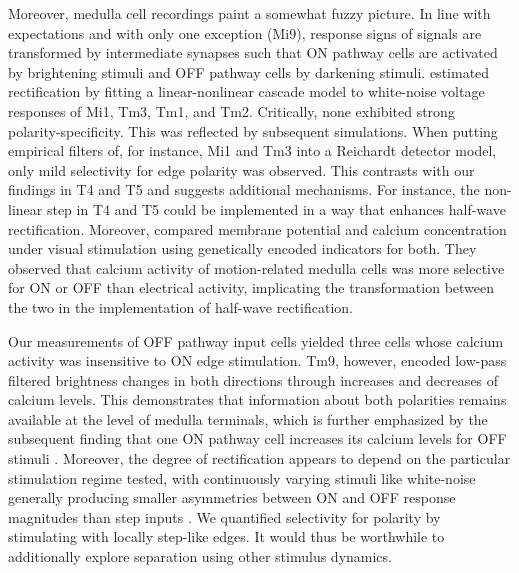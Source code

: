 Moreover, medulla cell recordings paint a somewhat fuzzy picture. In line with expectations and with only one exception (Mi9), response signs of signals are transformed by intermediate synapses such that ON pathway cells are activated by brightening stimuli and OFF pathway cells by darkening stimuli. \citet{Behnia:2014jh} estimated rectification by fitting a linear-nonlinear cascade model to white-noise voltage responses of Mi1, Tm3, Tm1, and Tm2. Critically, none exhibited strong polarity-specificity. This was reflected by subsequent simulations. When putting empirical filters of, for instance, Mi1 and Tm3 into a Reichardt detector model, only mild selectivity for edge polarity was observed. This contrasts with our findings in T4 and T5 and suggests additional mechanisms. For instance, the non-linear step in T4 and T5 could be implemented in a way that enhances half-wave rectification. Moreover, \citet{Yang:2016aa} compared membrane potential and calcium concentration under visual stimulation using genetically encoded indicators for both. They observed that calcium activity of motion-related medulla cells was more selective for ON or OFF than electrical activity, implicating the transformation between the two in the implementation of half-wave rectification.

Our measurements of OFF pathway input cells yielded three cells whose calcium activity was insensitive to ON edge stimulation. Tm9, however, encoded low-pass filtered brightness changes in both directions through increases and decreases of calcium levels. This demonstrates that information about both polarities remains available at the level of medulla terminals, which is further emphasized by the subsequent finding that one ON pathway cell increases its calcium levels for OFF stimuli \citep{Arenz:2017aa,Strother:2017aa}. Moreover, the degree of rectification appears to depend on the particular stimulation regime tested, with continuously varying stimuli like white-noise generally producing smaller asymmetries between ON and OFF response magnitudes than step inputs \citep{Reiff:2010eo,Clark:2011gw,Behnia:2014jh,Arenz:2017aa}. We quantified selectivity for polarity by stimulating with locally step-like edges. It would thus be worthwhile to additionally explore separation using other stimulus dynamics.


